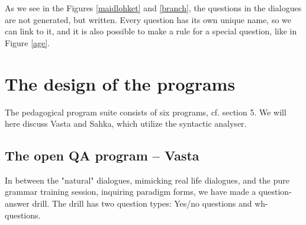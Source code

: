 \documentclass[11pt]{article}
\begin{document}
As we see in the Figures \ref{maidlohket} and \ref{branch}, the questions in the dialogues are not generated, but written. Every question has its own unique name, so we can link to it, and it is also possible to make a rule for a special question, like in Figure \ref{age}.  


\section{The design of the programs}
The pedagogical program suite consists of six programs, cf. section 5. We will here discuss Vasta and Sahka, which utilize the syntactic analyser. 






\subsection{The open QA program -- Vasta}	

In between the "natural" dialogues, mimicking real life dialogues, and the pure grammar training session, inquiring paradigm forms, we have made 
a question-answer drill. The drill has two question types: Yes/no questions and wh-questions. 
\end{document}
